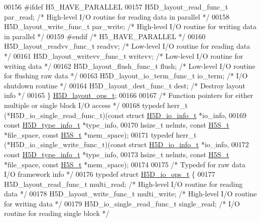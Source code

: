 \begin{DoxyCode}
00156 \textcolor{preprocessor}{#ifdef H5\_HAVE\_PARALLEL}
00157     H5D\_layout\_read\_func\_t par\_read;    \textcolor{comment}{/* High-level I/O routine for reading data in parallel */}
00158     H5D\_layout\_write\_func\_t par\_write;  \textcolor{comment}{/* High-level I/O routine for writing data in parallel */}
00159 \textcolor{preprocessor}{#endif }\textcolor{comment}{/* H5\_HAVE\_PARALLEL */}\textcolor{preprocessor}{}
00160     H5D\_layout\_readvv\_func\_t readvv;    \textcolor{comment}{/* Low-level I/O routine for reading data */}
00161     H5D\_layout\_writevv\_func\_t writevv;  \textcolor{comment}{/* Low-level I/O routine for writing data */}
00162     H5D\_layout\_flush\_func\_t flush;      \textcolor{comment}{/* Low-level I/O routine for flushing raw data */}
00163     H5D\_layout\_io\_term\_func\_t io\_term;  \textcolor{comment}{/* I/O shutdown routine */}
00164     H5D\_layout\_dest\_func\_t dest;        \textcolor{comment}{/* Destroy layout info */}
00165 \} \hyperlink{struct_h5_d__layout__ops__t}{H5D\_layout\_ops\_t};
00166 
00167 \textcolor{comment}{/* Function pointers for either multiple or single block I/O access */}
00168 \textcolor{keyword}{typedef} herr\_t (*H5D\_io\_single\_read\_func\_t)(\textcolor{keyword}{const} \textcolor{keyword}{struct }\hyperlink{struct_h5_d__io__info__t}{H5D\_io\_info\_t} *io\_info,
00169     \textcolor{keyword}{const} \hyperlink{struct_h5_d__type__info__t}{H5D\_type\_info\_t} *type\_info,
00170     hsize\_t nelmts, \textcolor{keyword}{const} \hyperlink{struct_h5_s__t}{H5S\_t} *file\_space, \textcolor{keyword}{const} \hyperlink{struct_h5_s__t}{H5S\_t} *mem\_space);
00171 \textcolor{keyword}{typedef} herr\_t (*H5D\_io\_single\_write\_func\_t)(\textcolor{keyword}{const} \textcolor{keyword}{struct }\hyperlink{struct_h5_d__io__info__t}{H5D\_io\_info\_t} *io\_info,
00172     \textcolor{keyword}{const} \hyperlink{struct_h5_d__type__info__t}{H5D\_type\_info\_t} *type\_info,
00173     hsize\_t nelmts, \textcolor{keyword}{const} \hyperlink{struct_h5_s__t}{H5S\_t} *file\_space, \textcolor{keyword}{const} \hyperlink{struct_h5_s__t}{H5S\_t} *mem\_space);
00174 
00175 \textcolor{comment}{/* Typedef for raw data I/O framework info */}
00176 \textcolor{keyword}{typedef} \textcolor{keyword}{struct }\hyperlink{struct_h5_d__io__ops__t}{H5D\_io\_ops\_t} \{
00177     H5D\_layout\_read\_func\_t multi\_read;          \textcolor{comment}{/* High-level I/O routine for reading data */}
00178     H5D\_layout\_write\_func\_t multi\_write;        \textcolor{comment}{/* High-level I/O routine for writing data */}
00179     H5D\_io\_single\_read\_func\_t single\_read;      \textcolor{comment}{/* I/O routine for reading single block */}

\end{DoxyCode}
